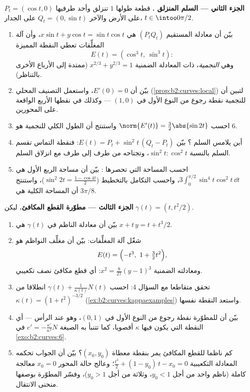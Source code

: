 \begin{problem}
\medskip
\noindent\textbf{الجزء الثاني --- السلم المنزلق .} قطعة
طولها $1$ تنزلق وأحد طرفيها $P_t =
(\cos t, 0)$ على الأرض والآخر $Q_t = (0, \sin t)$ على
الجدار، $t \in \intoo0{\pi/2}$.
\begin{enumerate}[resume]
  \item بيّن أن معادلة المستقيم $(P_tQ_t)$ هي $x\sin t +
        y\cos t = \sin t\cos t$، وأن آلة المغلِّفات
        تعطي النقطة المميزة
        \[
        E(t) = (\cos^3 t,\ \sin^3 t) :
        \]
        وهي \emph{النجمية}، ذات المعادلة الضمنية $x^{2/3} + y^{2/3} = 1$
        (ممتدة إلى الأرباع الأخرى بالتناظر).
  \item بيّن أن $E'(0) = 0$، واستعمل التصنيف المحلي (\cref{prop:b2:curves:local}) لتبين أن
        للنجمية نقطة رجوع من النوع الأول في $(1, 0)$ --- وكذلك في
        نقطها الأربع الواقعة على المحورين.
  \item احسب $\norm{E'(t)} = \tfrac32\abs{\sin 2t}$ واستنتج أن الطول الكلي للنجمية هو $6$.
  \item أين يلامس السلم ؟ بيّن $E(t) =
        P_t + \sin^2 t\,(Q_t - P_t)$: فنقطة التماس تقسم
        السلم بالنسبة $\sin^2 t : \cos^2
        t$، وتجتاحه من طرف إلى طرف مع انزلاق
        السلم.
  \item احسب المساحة التي تحصرها : بيّن أن مساحة الربع الأول
        هي $3\int_0^{\pi/2}\sin^4
        t\cos^2 t\,\dd t$، واحسب التكامل بالتخطيط ($\sin^2 2t = \tfrac{1 - \cos 4t}2$)، واستنتج أن
        المساحة الكلية هي $3\pi/8$.
\end{enumerate}

\medskip
\noindent\textbf{الجزء الثالث --- مطوّرة القطع المكافئ.} ليكن
$\gamma(t) = (t, t^2/2)$.
\begin{enumerate}[resume]
  \item بيّن أن معادلة الناظم في $\gamma(t)$ هي $x + t\,y = t + t^3/2$.
  \item شغّل آلة المغلِّفات: بيّن أن مغلِّف النواظم هو
        \[
        E(t) = \Bigl(-t^3,\ 1 + \tfrac32 t^2\Bigr),
        \]
        ومعادلته الضمنية $x^2 = \tfrac8{27}(y - 1)^3$: أي قطع مكافئ نصف تكعيبي.
  \item تحقق متقاطعا مع السؤال 4: احسب  $\gamma(t) + \frac1{\kappa(t)}N(t)$ انطلاقا
        من
        $\kappa(t) = (1 + t^2)^{-3/2}$
        (\cref{ex:b2:curves:kappaexamples}) واستعد النقطة نفسها.
  \item بيّن أن للمطوّرة نقطة رجوع من النوع الأول في $(0, 1)$، وهو
         عند الرأس --- أي النقطة التي يكون فيها $\kappa$
        أقصويا، كما تتنبأ به الصيغة $c' = -\frac{\kappa'}{\kappa^2}N$ في \cref{exo:b2:curves:6}.
  \item كم ناظما للقطع المكافئ يمر بنقطة معطاة $(x_0, y_0)$؟ بيّن أن
        الجواب تحكمه المعادلة التكعيبية $\tfrac{t^3}2 + (1 - y_0)\,t - x_0 = 0$؛ وعالج حالة المحور
        $x_0 = 0$ معالجة كاملة (ناظم واحد من أجل $y_0 < 1$، وثلاثة من أجل
        $y_0 > 1$)، وفسّر المطوّرة بوصفها منحنى الانتقال.
\end{enumerate}


\end{problem}
